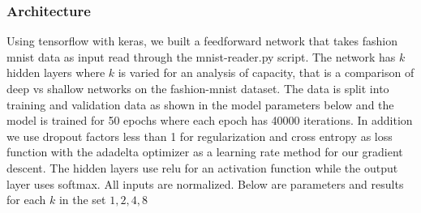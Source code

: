 \documentclass{article}
\begin{document}
\subsubsection{Architecture}
\par Using tensorflow with keras, we built a feedforward network that takes fashion mnist data as input read through the mnist-reader.py script. The network has $k$ hidden layers where $k$ is varied for an analysis of capacity, that is a comparison of deep vs shallow networks on the fashion-mnist dataset. The data is split into training and validation data as shown in the model parameters below and the model is trained for 50 epochs where each epoch has 40000 iterations. In addition we use dropout factors less than 1 for regularization and cross entropy as loss function with the adadelta optimizer as a learning rate method for our gradient descent. The hidden layers use relu for an activation function while the output layer uses softmax. All inputs are normalized. Below are parameters and results for each $k$ in the set ${1,2,4,8}$
\clearpage
\end{document}
